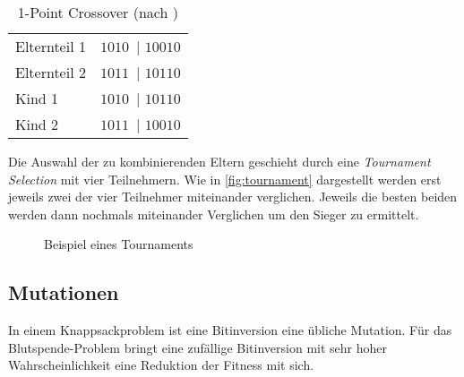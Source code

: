\begin{table}[ht]
    \begin{center}
        \begin{tabular}{l c}
            Elternteil 1 & \colorbox{lime!30}{$1010$~}$\mid$\colorbox{lime!30}{ $10010$} \\
            Elternteil 2 & \colorbox{cyan!30}{$1011$~}$\mid$\colorbox{cyan!30}{ $10110$} \\
            \hline
            Kind 1       & \colorbox{lime!30}{$1010$~}$\mid$\colorbox{cyan!30}{ $10110$} \\
            Kind 2       & \colorbox{cyan!30}{$1011$~}$\mid$\colorbox{lime!30}{ $10010$} \\
        \end{tabular}
    \end{center}
    \caption{1-Point Crossover (nach \cite{AJ2015})}
\end{table}

Die Auswahl der zu kombinierenden Eltern geschieht durch eine \emph{Tournament Selection} mit vier Teilnehmern.
Wie in \autoref{fig:tournament} dargestellt werden erst jeweils zwei der vier Teilnehmer miteinander verglichen.
Jeweils die besten beiden werden dann nochmals miteinander Verglichen um den Sieger zu ermittelt.

\begin{figure}[h]
    \centering
    \caption{Beispiel eines Tournaments}
    \label{fig:tournament}
\end{figure}

\subsection{Mutationen}
In einem Knappsackproblem ist eine Bitinversion eine übliche Mutation.
Für das Blutspende-Problem bringt eine zufällige Bitinversion mit sehr hoher Wahrscheinlichkeit
eine Reduktion der Fitness mit sich.

